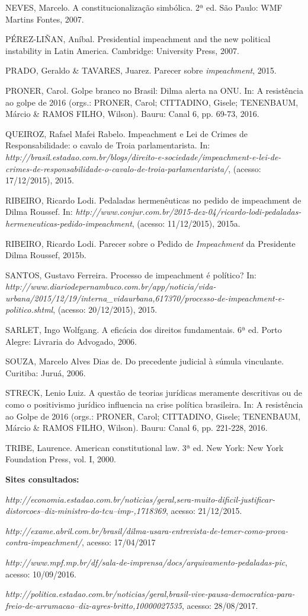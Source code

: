 NEVES, Marcelo. A constitucionalização simbólica. 2ª ed. São Paulo: WMF
Martins Fontes, 2007.

PÉREZ-LIÑAN, Aníbal. Presidential impeachment and the new political
instability in Latin America. Cambridge: University Press, 2007.

PRADO, Geraldo \& TAVARES, Juarez. Parecer sobre \emph{impeachment},
2015.

PRONER, Carol. Golpe branco no Brasil: Dilma alerta na ONU. In: A
resistência ao golpe de 2016 (orgs.: PRONER, Carol; CITTADINO, Gisele;
TENENBAUM, Márcio \& RAMOS FILHO, Wilson). Bauru: Canal 6, pp. 69-73,
2016.

QUEIROZ, Rafael Mafei Rabelo. Impeachment e Lei de Crimes de
Responsabilidade: o cavalo de Troia parlamentarista. In:
\emph{http://brasil.estadao.com.br/blogs/direito-e-sociedade/impeachment-e-lei-de-crimes-de-responsabilidade-o-cavalo-de-troia-parlamentarista/},
(acesso: 17/12/2015), 2015.

RIBEIRO, Ricardo Lodi. Pedaladas hermenêuticas no pedido de impeachment
de Dilma Roussef. In:
\emph{http://www.conjur.com.br/2015-dez-04/ricardo-lodi-pedaladas-hermeneuticas-pedido-impeachment},
(acesso: 11/12/2015), 2015a.

RIBEIRO, Ricardo Lodi. Parecer sobre o Pedido de \emph{Impeachment} da
Presidente Dilma Roussef, 2015b.

SANTOS, Gustavo Ferreira. Processo de impeachment é político? In:
\emph{http://www.diariodepernambuco.com.br/app/noticia/vida-urbana/2015/12/19/interna\_vidaurbana,617370/processo-de-impeachment-e-politico.shtml},
(acesso: 20/12/2015), 2015.

SARLET, Ingo Wolfgang. A eficácia dos direitos fundamentais. 6ª ed.
Porto Alegre: Livraria do Advogado, 2006.

SOUZA, Marcelo Alves Dias de. Do precedente judicial à súmula
vinculante. Curitiba: Juruá, 2006.

STRECK, Lenio Luiz. A questão de teorias jurídicas meramente descritivas
ou de como o positivismo jurídico influencia na crise política
brasileira. In: A resistência ao Golpe de 2016 (orgs.: PRONER, Carol;
CITTADINO, Gisele; TENENBAUM, Márcio \& RAMOS FILHO, Wilson). Bauru:
Canal 6, pp. 221-228, 2016.

TRIBE, Laurence. American constitutional law. 3ª ed. New York: New York
Foundation Press, vol. I, 2000.

\textbf{Sites consultados:}

\emph{http://economia.estadao.com.br/noticias/geral,sera-muito-dificil-justificar-distorcoes--diz-ministro-do-tcu--imp-,1718369},
acesso: 21/12/2015.

\emph{http://exame.abril.com.br/brasil/dilma-usara-entrevista-de-temer-como-prova-contra-impeachment/},
acesso: 17/04/2017

\emph{http://www.mpf.mp.br/df/sala-de-imprensa/docs/arquivamento-pedaladas-pic},
acesso: 10/09/2016.

\emph{http://politica.estadao.com.br/noticias/geral,brasil-vive-pausa-democratica-para-freio-de-arrumacao--diz-ayres-britto,10000027535},
acesso: 28/08/2017.
